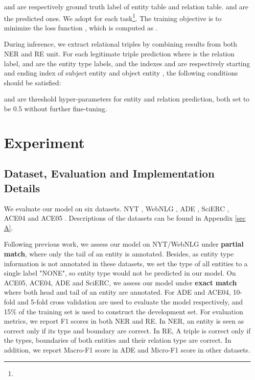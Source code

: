 \documentclass[11pt]{article}
\begin{document}
 and  are respectively ground truth label of entity table and relation table.  and  are the predicted ones. We adopt  for each task\footnote{}. The training objective is to minimize the loss function , which is computed as .

During inference, we extract relational triples by combining results from both NER and RE unit. For each legitimate triple prediction  where  is the relation label,  and  are the entity type labels, and the indexes  and  are respectively starting and ending index of subject entity  and object entity , the following conditions should be satisfied:


 and  are threshold hyper-parameters for entity and relation prediction, both set to be 0.5 without further fine-tuning.


\section{Experiment}

\subsection{Dataset, Evaluation and Implementation Details}
We evaluate our model on six datasets. NYT \citep{riedel2010modeling}, WebNLG \citep{zeng-etal-2018-extracting}, ADE \citep{gurulingappa2012development}, SciERC \citep{luan-etal-2018-multi}, ACE04 and ACE05 \citep{walker2006ace}. Descriptions of the datasets can be found in Appendix \ref{sec A}.

Following previous work, we assess our model on NYT/WebNLG under \textbf{partial match}, where only the tail of an entity is annotated. Besides, as entity type information is not annotated in these datasets, we set the type of all entities to a single label "NONE", so entity type would not be predicted in our model. On ACE05, ACE04, ADE and SciERC, we assess our model under \textbf{exact match} where both head and tail of an entity are annotated. For ADE and ACE04, 10-fold and 5-fold cross validation are used to evaluate the model respectively, and 15\% of the training set is used to construct the development set. For evaluation metrics, we report F1 scores in both NER and RE. In NER, an entity is seen as correct only if its type and boundary are correct. In RE, A triple is correct only if the types, boundaries of both entities and their relation type are correct. In addition, we report Macro-F1 score in ADE and Micro-F1 score in other datasets. 
\end{document}

